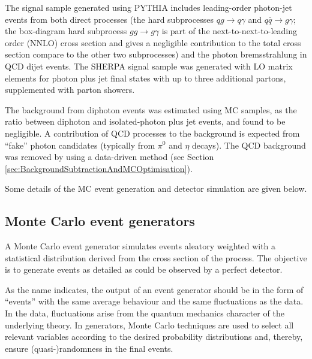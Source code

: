 \documentclass[12pt, twoside]{article}
\numberwithin{equation}{section}
\numberwithin{figure}{section}
\begin{document}
The signal sample generated using PYTHIA includes leading-order photon-jet events from both direct processes (the hard subprocesses $q g \rightarrow{} q \gamma$ and $q \bar{q} \rightarrow{} g \gamma$; the box-diagram hard subprocess $g g \rightarrow{} g \gamma$ is part of the next-to-next-to-leading order (NNLO) cross section and gives a negligible contribution to the total cross section compare to the other two subprocesses) and the photon bremsstrahlung in QCD dijet events. The SHERPA signal sample was generated with LO matrix elements for photon plus jet final states with up to three additional partons, supplemented with parton showers.

The background from diphoton events was estimated using MC samples, as the ratio between diphoton and isolated-photon plus jet events, and found to be negligible. A contribution of QCD processes to the background is expected from ``fake'' photon candidates (typically from $\pi^{0}$ and $\eta$ decays). The QCD background was removed by using a data-driven method (see Section \ref{sec:BackgroundSubtractionAndMCOptimisation}).

Some details of the MC event generation and detector simulation are given below.

\newpage
\subsection{Monte Carlo event generators}
\label{subsec:MonteCarloEventGenerators}

A Monte Carlo event generator simulates events aleatory weighted with a statistical distribution derived from the cross section of the process. The objective is to generate events as detailed as could be observed by a perfect detector.

As the name indicates, the output of an event generator should be in the form of ``events'' with the same average behaviour and the same fluctuations as the data. In the data, fluctuations arise from the quantum mechanics character of the underlying theory. In generators, Monte Carlo techniques are used to select all relevant variables according to the desired probability distributions and, thereby, ensure (quasi-)randomness in the final events.
\end{document}
